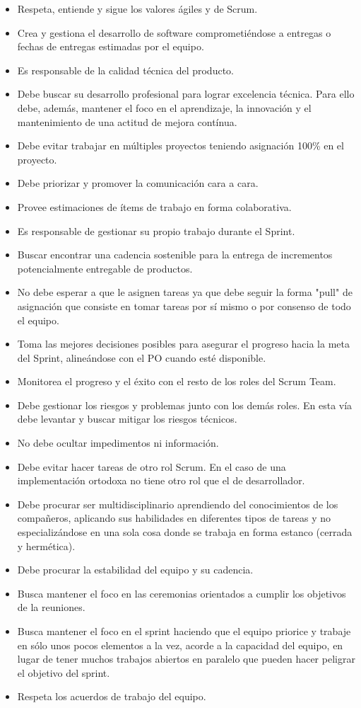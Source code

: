 \begin{itemize}
\item Respeta, entiende y sigue los valores ágiles y de Scrum.
\item Crea y gestiona el desarrollo de software comprometiéndose a entregas o fechas de entregas estimadas por el equipo.
\item Es responsable de la calidad técnica del producto.
\item Debe buscar su desarrollo profesional para lograr excelencia técnica. Para ello debe, además, mantener el foco en el aprendizaje, la innovación y el mantenimiento de una actitud de mejora contínua.
\item Debe evitar trabajar en múltiples proyectos teniendo asignación 100\% en el proyecto.
\item Debe priorizar y promover la comunicación cara a cara.
\item Provee estimaciones de ítems de trabajo en forma colaborativa. 
\item Es responsable de gestionar su propio trabajo durante el Sprint.
\item Buscar encontrar una cadencia sostenible para la entrega de incrementos potencialmente entregable de productos.
\item No debe esperar a que le asignen tareas ya que debe seguir la forma "pull" de asignación que consiste en tomar tareas por sí mismo o por consenso de todo el equipo.
\item Toma las mejores decisiones posibles para asegurar el progreso hacia la meta del Sprint, alineándose con el PO cuando esté disponible.
\item Monitorea el progreso y el éxito con el resto de los roles del Scrum Team.
\item Debe gestionar los riesgos y problemas junto con los demás roles. En esta vía debe levantar y buscar mitigar los riesgos técnicos.
\item No debe ocultar impedimentos ni información.
\item Debe evitar hacer tareas de otro rol Scrum. En el caso de una implementación ortodoxa no tiene otro rol que el de desarrollador.
\item Debe procurar ser multidisciplinario aprendiendo del conocimientos de los compañeros, aplicando sus habilidades en diferentes tipos de tareas y no especializándose en una sola cosa donde se trabaja en forma estanco (cerrada y hermética).
\item Debe procurar la estabilidad del equipo y su cadencia.
\item Busca mantener el foco en las ceremonias orientados a cumplir los objetivos de la reuniones.
\item Busca mantener el foco en el sprint haciendo que el equipo priorice y trabaje en sólo unos pocos elementos a la vez, acorde a la capacidad del equipo, en lugar de tener muchos trabajos abiertos en paralelo que pueden hacer peligrar el objetivo del sprint.
\item Respeta los acuerdos de trabajo del equipo.
\end{itemize}


